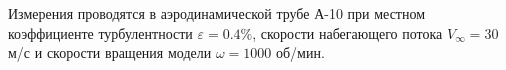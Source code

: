\documentclass[specialist, subf, href, colorlinks=true, 14pt, final]{disser}
\theoremstyle{definition}
\begin{document}
Измерения проводятся в аэродинамической трубе А-10 при местном коэффициенте турбулентности $\varepsilon = 0.4\%$, скорости  набегающего потока $V_{\infty} = 30$ м/с и скорости вращения модели $\omega = 1000$ об/мин.
\begin{figure}[!htp]
  \caption{}
  \label{2-8-4}
\end{figure}
\end{document}
